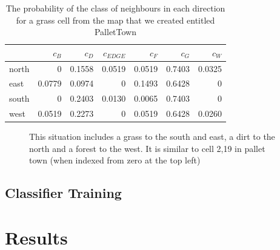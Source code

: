 \documentclass[preprint,3p,12pt]{elsarticle}
\begin{document}
\begin{table}[h]
\small
\begin{center}
\begin{tabular}{ l | r r r r r r }
              & $c_{B}$& $c_{D}$& $c_{EDGE}$& $c_{F}$& $c_{G}$& $c_{W}$ \\ 
              \hline
    north     & 0      & 0.1558 & 0.0519    & 0.0519 & 0.7403 & 0.0325\\
    east      & 0.0779 & 0.0974 & 0         & 0.1493 & 0.6428 & 0\\
    south     & 0      & 0.2403 & 0.0130    & 0.0065 & 0.7403 & 0\\
    west      & 0.0519 & 0.2273 & 0         & 0.0519 & 0.6428 & 0.0260\\
\end{tabular}
\caption{The probability of the class of neighbours in each direction for a
    grass cell from the map that we created entitled PalletTown} 
\end{center}
\end{table}

\begin{figure}[h]
\begin{center}
\end{center}
\caption{This situation includes a grass to the south and east, a dirt to the
    north and a forest to the west. It is similar to cell 2,19 in pallet town
    (when indexed from zero at the top left)}
\end{figure}

\subsection{Classifier Training}
\label{process:training}
\lipsum[1-2]


\section{Results}
\label{results}
\lipsum[1-2]
\end{document}
